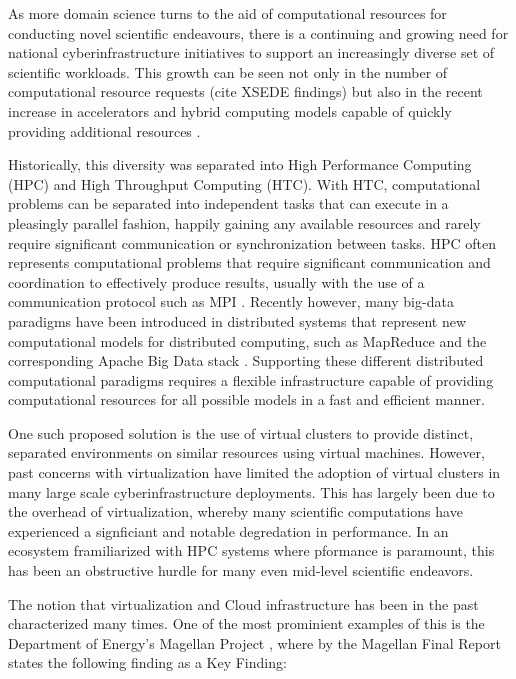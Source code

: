 
As more domain science turns to the aid of computational resources for conducting novel scientific endeavours, there is a continuing and growing need for national cyberinfrastructure initiatives to support an increasingly diverse set of scientific workloads. This growth can be seen not only in the number of computational resource requests (cite XSEDE findings) but also in the recent increase in accelerators and hybrid computing models capable of quickly providing additional resources \cite{vetter2011keeneland}.  

Historically, this diversity was separated into High Performance Computing (HPC) and High Throughput Computing (HTC).  With HTC, computational problems can be separated into independent tasks that can execute in a pleasingly parallel fashion, happily gaining any available resources and rarely require significant communication or synchronization between tasks. HPC often represents computational problems that require significant communication and coordination to effectively produce results, usually with the use of a communication protocol such as MPI \cite{mpi}.  Recently however, many big-data paradigms \cite{bigdata} have been introduced in distributed systems that represent new computational models for distributed computing, such as MapReduce \cite{MapReduce} and the corresponding Apache Big Data stack \cite{Jha2014apache}. Supporting these different distributed computational paradigms requires a flexible infrastructure capable of providing computational resources for all possible models in a fast and efficient manner. 


One such proposed solution is the use of virtual clusters \cite{foster2006virtual} to provide distinct, separated environments on similar resources using virtual machines. However, past concerns with virtualization have limited the adoption of virtual clusters in many large scale cyberinfrastructure deployments. This has largely been due to the overhead of virtualization, whereby many scientific computations have experienced a signficiant and notable degredation in performance.  In an ecosystem framiliarized with HPC systems where pformance is paramount, this has been an obstructive hurdle for many even mid-level scientific endeavors.

The notion that virtualization and Cloud infrastructure has been in the past characterized many times. One of the most prominient examples of this is the Department of Energy's Magellan Project \cite{www-magellan}, where by the Magellan Final Report \cite{MagellanFinal} states the following finding as a Key Finding:
  
